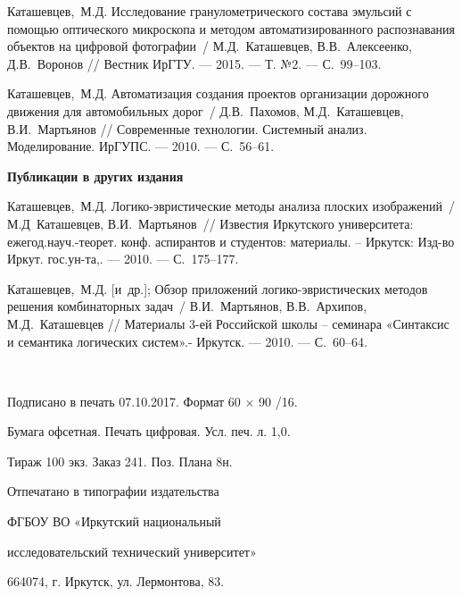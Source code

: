 \begin{thebibliography}{10}
 Каташевцев,~М.Д. Исследование гранулометрического
  состава эмульсий с помощью оптического
  микроскопа и методом автоматизированного
  распознавания объектов на цифровой
  фотографии~/ М.Д.~Каташевцев, В.В.~Алексеенко, Д.В.~Воронов // Вестник ИрГТУ.
--- 2015.
--- Т. №2.
--- {С.}~99--103.{}

 Каташевцев,~М.Д. Автоматизация создания проектов
  организации дорожного движения для
  автомобильных дорог~/ Д.В.~Пахомов, М.Д.~Каташевцев, В.И.~Мартьянов // Современные
  технологии. Системный анализ.
  Моделирование. ИрГУПС.
--- 2010.
--- {С.}~56--61.{}

\centerline{\textbf{Публикации в других издания}}

 Каташевцев,~М.Д. Логико-эвристические методы анализа
  плоских изображений~/ М.Д~Каташевцев,
  В.И.~Мартьянов~// Известия Иркутского
  университета: ежегод.науч.-теорет. конф.
  аспирантов и студентов: материалы. –
  Иркутск: Изд-во Иркут. гос.ун-та,.
--- 2010.
--- {С.}~175--177.{}

 Каташевцев,~М.Д.
  {[и~др.]}; Обзор приложений
  логико-эвристических методов решения
  комбинаторных задач~/ В.И.~Мартьянов, В.В.~Архипов, М.Д.~Каташевцев // Материалы 3-ей
  Российской школы – семинара «Синтаксис и
  семантика логических систем».- Иркутск.
--- 2010.
--- {С.}~60--64.{}

\end{thebibliography}

\pagebreak
~
\vfill
{}
\begin{center}
Подписано в печать 07.10.2017. Формат 60 $\times$ 90 /16.

Бумага офсетная. Печать цифровая. Усл. печ. л. 1,0.

Тираж 100 экз. Заказ 241. Поз. Плана 8н.
\bigskip

Отпечатано в типографии издательства

ФГБОУ ВО «Иркутский национальный 

исследовательский технический университет»

664074, г. Иркутск, ул. Лермонтова, 83.
\end{center}